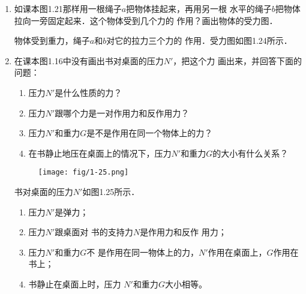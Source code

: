 \begin{enumerate}
\item 如课本图1.21那样用一根绳子$a$把物体挂起来，再用另一根
水平的绳子$b$把物体拉向一旁固定起来．这个物体受到几个力的
作用？画出物体的受力图．

\begin{solution}
    物体受到重力，绳子$a$和$b$对它的拉力三个力的
作用．受力图如图1.24所示．
\end{solution}

\item  在课本图1.16中没有画出书对桌面的压力$N'$，把这个力
画出来，并回答下面的问题：
\begin{enumerate}
\item 压力$N'$是什么性质的力？
\item 压力$N'$跟哪个力是一对作用力和反作用力？
\item 压力$N'$和重力$G$是不是作用在同一个物体上的力？
\item 在书静止地压在桌面上的情况下，压力$N'$和重力$G$的大小有什么关系？
\end{enumerate}

\begin{figure}[htp]\centering
    \begin{minipage}[t]{0.48\textwidth}
    \centering
{}
    \caption{}
    \end{minipage}
    \begin{minipage}[t]{0.48\textwidth}
    \centering
    \texttt{[image: fig/1-25.png]}
    \caption{}
    \end{minipage}
    \end{figure}

\begin{solution}
    书对桌面的压力$N'$如图1.25所示．
\begin{enumerate}
\item 压力$N'$是弹力；    
\item 压力$N'$跟桌面对
书的支持力$N$是作用力和反作
用力；    
\item 压力$N'$和重力$G$不
是作用在同一物体上的力，$N'$作用在桌面上，$G$作用在书上；    
\item 书静止在桌面上时，压力
$N'$和重力$G$大小相等。
\end{enumerate}

\end{solution}
\end{enumerate}

